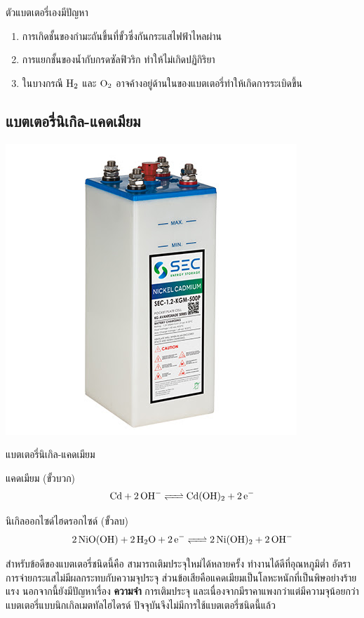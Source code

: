 \documentclass[a4paper,nobib,openany,10pt]{tufte-book}
\begin{document}
ตัวแบตเตอรี่เองมีปัญหา

\begin{enumerate}
\item การเกิดชั้นของกำมะถันขึ้นที่ขั้วซึ่งกันกระแสไฟฟ้าไหลผ่าน
\item การแยกชั้นของน้ำกับกรดซัลฟิวริก ทำให้ไม่เกิดปฏิกิริยา
\item ในบางกรณี \(\ce{H2}\) และ \(\ce{O2}\) อาจค้างอยู่ด้านในของแบตเตอรี่ทำให้เกิดการระเบิดขึ้น
\end{enumerate}

\subsection{แบตเตอรี่นิเกิล-แคดเมียม}
\label{sec:org980690e}

\begin{marginfigure}
  \centering
  \includegraphics[width=\textwidth]{pictures/nickel-cadmium-battery}
\caption{แบตเตอรี่นิเกิล-แคดเมียม}
\end{marginfigure}

แคดเมียม (ขั้วบวก)
$$ \ce{Cd + 2OH^- <=> Cd(OH)_2 + 2e^-} $$

นิเกิลออกไซด์ไฮดรอกไซด์ (ขั้วลบ)
$$ \ce{2NiO(OH) + 2H_2O + 2e^- <=> 2Ni(OH)_2 + 2OH^-} $$

สำหรับข้อดีของแบตเตอรี่ชนิดนี้คือ สามารถเติมประจุใหม่ได้หลายครั้ง ทำงานได้ดีที่อุณหภูมิต่ำ อัตราการจ่ายกระแสไม่มีผลกระทบกับความจุประจุ ส่วนข้อเสียคือแคดเมียมเป็นโลหะหนักที่เป็นพิษอย่างร้ายแรง นอกจากนี้ยังมีปัญหาเรื่อง \textbf{ความจำ} การเติมประจุ และเนื่องจากมีราคาแพงกว่าแต่มีความจุน้อยกว่าแบตเตอรี่แบบนิกเกิลเมตทัลไฮไดรด์ ปัจจุบันจึงไม่มีการใช้แบตเตอรี่ชนิดนี้แล้ว
\end{document}
